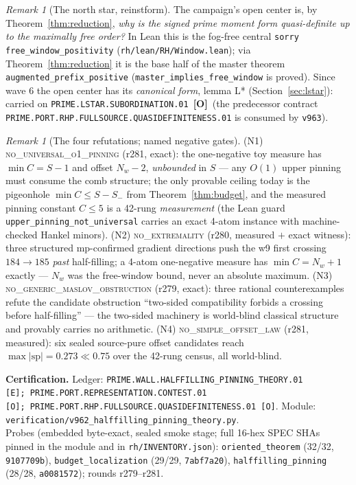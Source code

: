 \documentclass[11pt]{article}
\newcommand{\mO}{\textcolor{openred}{\textbf{[O]}}}
\newcommand{\certbox}[3]{%
  \par\medskip\noindent\colorbox{certgray}{\parbox{\dimexpr\linewidth-2\fboxsep}{%
    \footnotesize\raggedright\textbf{Certification.} Ledger: \texttt{#1}.\quad
    Module: \texttt{#2}.\\ #3}}\par\medskip}
\theoremstyle{definition}
\theoremstyle{remark}
\newtheorem{remark}[theorem]{Remark}
\begin{document}
\begin{remark}[The north star, reinstform]\label{rem:northstar}
The campaign's open center is, by Theorem~\ref{thm:reduction},
\emph{why is the signed prime moment form quasi-definite up to the
maximally free order?}  In Lean this is the fog-free central
\texttt{sorry} \texttt{free\_window\_positivity}
(\texttt{rh/lean/RH/Window.lean}); via Theorem~\ref{thm:reduction} it
is the base half of the master theorem
\texttt{augmented\_prefix\_positive}
(\texttt{master\_implies\_free\_window} is proved).  Since wave 6 the
open center has its \emph{canonical form}, lemma L*
(Section~\ref{sec:lstar}): carried on
\texttt{PRIME.LSTAR.SUBORDINATION.01}~\mO\ (the predecessor contract
\texttt{PRIME.PORT.RHP.FULLSOURCE.QUASIDEFINITENESS.01} is consumed by
\texttt{v963}).
\end{remark}

\begin{remark}[The four refutations; named negative gates]
\label{rem:refutations}
(N1) \textsc{no\_universal\_o1\_pinning} (r281, exact): the
one-negative toy measure has $\min C=S-1$ and offset $N_w-2$,
\emph{unbounded} in $S$ --- any $O(1)$ upper pinning must consume the
comb structure; the only provable ceiling today is the pigeonhole
$\min C\le S-S_-$ from Theorem~\ref{thm:budget}, and the measured
pinning constant $C\le5$ is a 42-rung \emph{measurement} (the Lean
guard \texttt{upper\_pinning\_not\_universal} carries an exact 4-atom
instance with machine-checked Hankel minors).  (N2)
\textsc{no\_extremality} (r280, measured $+$ exact witness): three
structured mp-confirmed gradient directions push the w9 first crossing
$184\to185$ \emph{past} half-filling; a 4-atom one-negative measure has
$\min C=N_w+1$ exactly --- $N_w$ was the free-window bound, never an
absolute maximum.  (N3) \textsc{no\_generic\_maslov\_obstruction}
(r279, exact): three rational counterexamples refute the candidate
obstruction ``two-sided compatibility forbids a crossing before
half-filling'' --- the two-sided machinery is world-blind classical
structure and provably carries no arithmetic.  (N4)
\textsc{no\_simple\_offset\_law} (r281, measured): six sealed
source-pure offset candidates reach $\max|\mathrm{sp}|=0.273\ll0.75$
over the 42-rung census, all world-blind.
\end{remark}

\certbox{PRIME.WALL.HALFFILLING\_PINNING\_THEORY.01 [E];\
PRIME.PORT.REPRESENTATION.CONTEST.01 [O];\
PRIME.PORT.RHP.FULLSOURCE.QUASIDEFINITENESS.01 [O]}%
{verification/v962\_halffilling\_pinning\_theory.py}%
{Probes (embedded byte-exact, sealed smoke stage; full 16-hex SPEC SHAs
pinned in the module and in \texttt{rh/INVENTORY.json}):
\texttt{oriented\_theorem} (32/32, \texttt{9107709b}),
\texttt{budget\_localization} (29/29, \texttt{7abf7a20}),
\texttt{halffilling\_pinning} (28/28, \texttt{a0081572}); rounds
r279--r281.}
\end{document}
